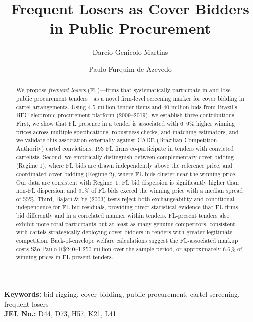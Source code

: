\begin{frontmatter}
\title{\textbf{Frequent Losers as Cover Bidders in Public Procurement}}
\author[INSPER]{Darcio Genicolo-Martins} 
\author[INSPER]{Paulo Furquim de Azevedo}
\address[INSPER]{INSPER --- Institute of Education and Research, S\~{a}o Paulo, Brazil}

\begin{abstract}
We propose \textit{frequent losers} (FL)---firms that systematically participate in and lose public procurement tenders---as a novel firm-level screening marker for cover bidding in cartel arrangements. Using 4.5 million tender-items and 40 million bids from Brazil's BEC electronic procurement platform (2009--2019), we establish three contributions. First, we show that FL presence in a tender is associated with 6--9\% higher winning prices across multiple specifications, robustness checks, and matching estimators, and we validate this association externally against CADE (Brazilian Competition Authority) cartel convictions: 193 FL firms co-participate in tenders with convicted cartelists. Second, we empirically distinguish between complementary cover bidding (Regime 1), where FL bids are drawn independently above the reference price, and coordinated cover bidding (Regime 2), where FL bids cluster near the winning price. Our data are consistent with Regime~1: FL bid dispersion is significantly higher than non-FL dispersion, and 91\% of FL bids exceed the winning price with a median spread of 55\%. Third, Bajari \& Ye (2003) tests reject both exchangeability and conditional independence for FL bid residuals, providing direct statistical evidence that FL firms bid differently and in a correlated manner within tenders. FL-present tenders also exhibit more total participants but at least as many genuine competitors, consistent with cartels strategically deploying cover bidders in tenders with greater legitimate competition. Back-of-envelope welfare calculations suggest the FL-associated markup costs S\~{a}o Paulo R\$240--1,250 million over the sample period, or approximately 6.6\% of winning prices in FL-present tenders.
\end{abstract}

\end{frontmatter}
\textbf{Keywords:} bid rigging, cover bidding, public procurement, cartel screening, frequent losers\\
\textbf{JEL No.:} D44, D73, H57, K21, L41
